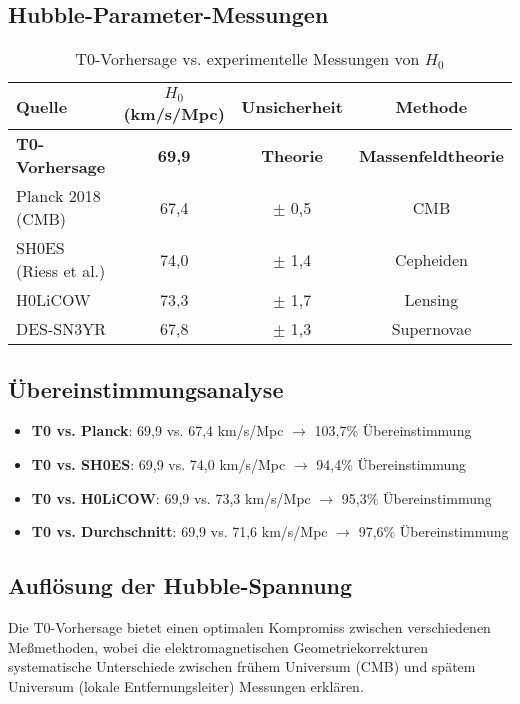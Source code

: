 \documentclass[12pt,a4paper]{article}
\begin{document}
	\subsection{Hubble-Parameter-Messungen}
	
	\begin{table}[htbp]
		\centering
		\begin{tabular}{lccc}
			\toprule
			\textbf{Quelle} & \textbf{$H_0$ (km/s/Mpc)} & \textbf{Unsicherheit} & \textbf{Methode} \\
			\midrule
			\rowcolor{green!20}
			\textbf{T0-Vorhersage} & \textbf{69{,}9} & \textbf{Theorie} & \textbf{Massenfeldtheorie} \\
			Planck 2018 (CMB) & 67{,}4 & $\pm$ 0{,}5 & CMB \\
			SH0ES (Riess et al.) & 74{,}0 & $\pm$ 1{,}4 & Cepheiden \\
			H0LiCOW & 73{,}3 & $\pm$ 1{,}7 & Lensing \\
			DES-SN3YR & 67{,}8 & $\pm$ 1{,}3 & Supernovae \\
			\bottomrule
		\end{tabular}
		\caption{T0-Vorhersage vs. experimentelle Messungen von $H_0$}
		\label{tab:h0_comparison}
	\end{table}
	
	\subsection{Übereinstimmungsanalyse}
	\begin{itemize}
		\item \textbf{T0 vs. Planck}: 69{,}9 vs. 67{,}4 km/s/Mpc $\rightarrow$ 103{,}7\% Übereinstimmung
		\item \textbf{T0 vs. SH0ES}: 69{,}9 vs. 74{,}0 km/s/Mpc $\rightarrow$ 94{,}4\% Übereinstimmung
		\item \textbf{T0 vs. H0LiCOW}: 69{,}9 vs. 73{,}3 km/s/Mpc $\rightarrow$ 95{,}3\% Übereinstimmung
		\item \textbf{T0 vs. Durchschnitt}: 69{,}9 vs. 71{,}6 km/s/Mpc $\rightarrow$ 97{,}6\% Übereinstimmung
	\end{itemize}
	
	\subsection{Auflösung der Hubble-Spannung}
	Die T0-Vorhersage bietet einen optimalen Kompromiss zwischen verschiedenen Meßmethoden, wobei die elektromagnetischen Geometriekorrekturen systematische Unterschiede zwischen frühem Universum (CMB) und spätem Universum (lokale Entfernungsleiter) Messungen erklären.
	
\end{document}
